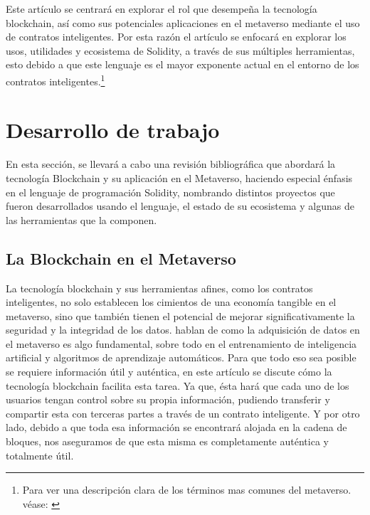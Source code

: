 \documentclass[a4paper,10pt]{article}
\begin{document}
	Este artículo se centrará en explorar el rol que desempeña la tecnología blockchain, así como sus potenciales aplicaciones en el metaverso mediante el uso de contratos inteligentes. Por esta razón el artículo se enfocará en explorar los usos, utilidades y ecosistema de Solidity, a través de sus múltiples herramientas, esto debido a que este lenguaje es el mayor exponente actual en el entorno de los contratos inteligentes.\footnote{Para ver una descripción clara de los términos mas comunes del metaverso. véase: \textcite{grandury2022implementacion}}
	\section{Desarrollo de trabajo}
	En esta sección, se llevará a cabo una revisión bibliográfica que abordará la tecnología Blockchain y su aplicación en el Metaverso, haciendo especial énfasis en el lenguaje de programación Solidity, nombrando distintos proyectos que fueron desarrollados usando el lenguaje, el estado de su ecosistema y algunas de las herramientas que la componen.
	
	\subsection{La Blockchain en el Metaverso}
	La tecnología blockchain y sus herramientas afines, como los contratos inteligentes, no solo establecen los cimientos de una economía tangible en el metaverso, sino que también tienen el potencial de mejorar significativamente la seguridad y la integridad de los datos. \textcite{huynh2023blockchain} hablan de como la adquisición de datos en el metaverso es algo fundamental, sobre todo en el entrenamiento de inteligencia artificial y algoritmos de aprendizaje automáticos. Para que todo eso sea posible se requiere información útil y auténtica, en este artículo se discute cómo la tecnología blockchain facilita esta tarea. Ya que, ésta hará que cada uno de los usuarios tengan control sobre su propia información, pudiendo transferir y compartir esta con terceras partes a través de un contrato inteligente. Y por otro lado, debido a que toda esa información se encontrará alojada en la cadena de bloques, nos aseguramos de que esta misma es completamente auténtica y totalmente útil. 
	
\end{document}
